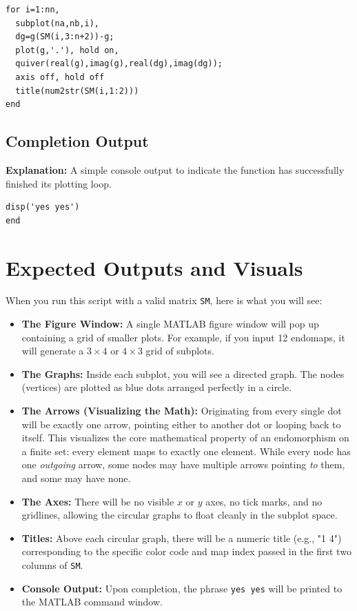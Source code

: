 \begin{lstlisting}
for i=1:nn,
  subplot(na,nb,i),
  dg=g(SM(i,3:n+2))-g;
  plot(g,'.'), hold on,
  quiver(real(g),imag(g),real(dg),imag(dg));
  axis off, hold off
  title(num2str(SM(i,1:2)))
end
\end{lstlisting}

\subsection{Completion Output}
\textbf{Explanation:} A simple console output to indicate the function has successfully finished its plotting loop.

\begin{lstlisting}
disp('yes yes')
end
\end{lstlisting}

\section{Expected Outputs and Visuals}

When you run this script with a valid matrix \texttt{SM}, here is what you will see:

\begin{itemize}
    \item \textbf{The Figure Window:} A single MATLAB figure window will pop up containing a grid of smaller plots. For example, if you input 12 endomaps, it will generate a $3 \times 4$ or $4 \times 3$ grid of subplots.
    \item \textbf{The Graphs:} Inside each subplot, you will see a directed graph. The nodes (vertices) are plotted as blue dots arranged perfectly in a circle.
    \item \textbf{The Arrows (Visualizing the Math):} Originating from every single dot will be exactly one arrow, pointing either to another dot or looping back to itself. This visualizes the core mathematical property of an endomorphism on a finite set: every element maps to exactly one element. While every node has one \textit{outgoing} arrow, some nodes may have multiple arrows pointing \textit{to} them, and some may have none.
    \item \textbf{The Axes:} There will be no visible $x$ or $y$ axes, no tick marks, and no gridlines, allowing the circular graphs to float cleanly in the subplot space.
    \item \textbf{Titles:} Above each circular graph, there will be a numeric title (e.g., "1 4") corresponding to the specific color code and map index passed in the first two columns of \texttt{SM}.
    \item \textbf{Console Output:} Upon completion, the phrase \texttt{yes yes} will be printed to the MATLAB command window.
\end{itemize}
